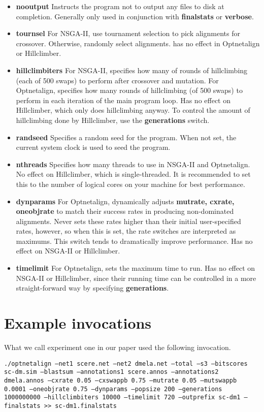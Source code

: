 \documentclass[11pt]{article} %
\begin{document}
\begin{itemize}
\item \textbf{nooutput} Instructs the program not to output any files to disk at completion. Generally only used in conjunction with \textbf{finalstats} or \textbf{verbose}.
\item \textbf{tournsel} For NSGA-II, use tournament selection to pick alignments for crossover. Otherwise, randomly select alignments. has no effect in Optnetalign or Hillclimber.
\item \textbf{hillclimbiters} For NSGA-II, specifies how many of rounds of hillclimbing (each of 500 swaps) to perform after crossover and mutation. For Optnetalign, specifies how many rounds of hillclimbing (of 500 swaps) to perform in each iteration of the main program loop. Has no effect on Hillclimber, which only does hillclimbing anyway. To control the amount of hillclimbing done by Hillclimber, use the \textbf{generations} switch.
\item \textbf{randseed} Specifies a random seed for the program. When not set, the current system clock is used to seed the program.
\item \textbf{nthreads} Specifies how many threads to use in NSGA-II and Optnetalign. No effect on Hillclimber, which is single-threaded. It is recommended to set this to the number of logical cores on your machine for best performance.
\item \textbf{dynparams} For Optnetalign, dynamically adjusts \textbf{mutrate, cxrate, oneobjrate} to match their success rates in producing non-dominated alignments. Never sets these rates higher than their initial user-specified rates, however, so when this is set, the rate switches are interpreted as maximums. This switch tends to dramatically improve performance. Has no effect on NSGA-II or Hillclimber.
\item \textbf{timelimit} For Optnetalign, sets the maximum time to run. Has no effect on NSGA-II or Hillclimber, since their running time can be controlled in a more straight-forward way by specifying \textbf{generations}.
\end{itemize}

\section{Example invocations}
What we call experiment one in our paper used the following invocation.

\texttt{./optnetalign --net1 scere.net --net2 dmela.net --total --s3 --bitscores sc-dm.sim --blastsum --annotations1 scere.annos --annotations2 dmela.annos --cxrate 0.05 --cxswappb 0.75 --mutrate 0.05 --mutswappb 0.0001 --oneobjrate 0.75 --dynparams --popsize 200 --generations 1000000000 --hillclimbiters 10000  --timelimit 720 --outprefix sc-dm1 --finalstats >> sc-dm1.finalstats}
\end{document}
